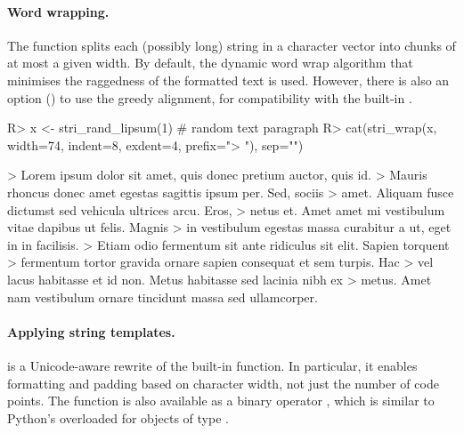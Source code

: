 \documentclass[nojss]{jss}
\begin{document}
\paragraph{Word wrapping.}
The  function splits each (possibly long)
string in a character vector into chunks of at most a given width.
By default, the dynamic word wrap algorithm \citep{Knuth:wrap}
that minimises the raggedness of the formatted text is used.
However, there is also an option ()
to use the greedy alignment,
for compatibility with the built-in .

\begin{Schunk}
\begin{Sinput}
R> x <- stri_rand_lipsum(1)  # random text paragraph
R> cat(stri_wrap(x, width=74, indent=8, exdent=4, prefix="> "), sep="\n")
\end{Sinput}
\begin{Soutput}
>         Lorem ipsum dolor sit amet, quis donec pretium auctor, quis id.
>     Mauris rhoncus donec amet egestas sagittis ipsum per. Sed, sociis
>     amet. Aliquam fusce dictumst sed vehicula ultrices arcu. Eros,
>     netus et. Amet amet mi vestibulum vitae dapibus ut felis. Magnis
>     in vestibulum egestas massa curabitur a ut, eget in in facilisis.
>     Etiam odio fermentum sit ante ridiculus sit elit. Sapien torquent
>     fermentum tortor gravida ornare sapien consequat et sem turpis. Hac
>     vel lacus habitasse et id non. Metus habitasse sed lacinia nibh ex
>     metus. Amet nam vestibulum ornare tincidunt massa sed ullamcorper.
\end{Soutput}
\end{Schunk}







\paragraph{Applying string templates.}
 is a Unicode-aware rewrite of the built-in
 function. In particular, it enables formatting and
padding based on character width, not just the number of code points.
The function is also available as a binary operator ,
which is similar to Python's \code{\%} overloaded for
objects of type .
\end{document}
